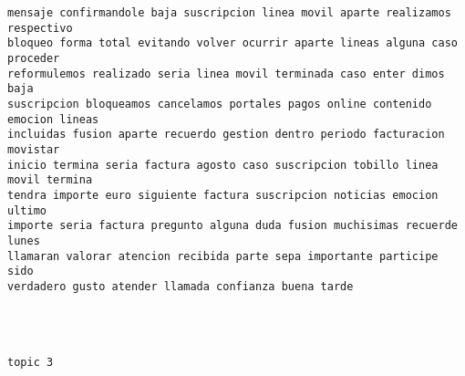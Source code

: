 \begin{Verbatim}[commandchars=\\\{\}]
mensaje confirmandole baja suscripcion linea movil aparte realizamos respectivo
bloqueo forma total evitando volver ocurrir aparte lineas alguna caso proceder
reformulemos realizado seria linea movil terminada caso enter dimos baja
suscripcion bloqueamos cancelamos portales pagos online contenido emocion lineas
incluidas fusion aparte recuerdo gestion dentro periodo facturacion movistar
inicio termina seria factura agosto caso suscripcion tobillo linea movil termina
tendra importe euro siguiente factura suscripcion noticias emocion ultimo
importe seria factura pregunto alguna duda fusion muchisimas recuerde lunes
llamaran valorar atencion recibida parte sepa importante participe sido
verdadero gusto atender llamada confianza buena tarde




topic 3


\end{Verbatim}
